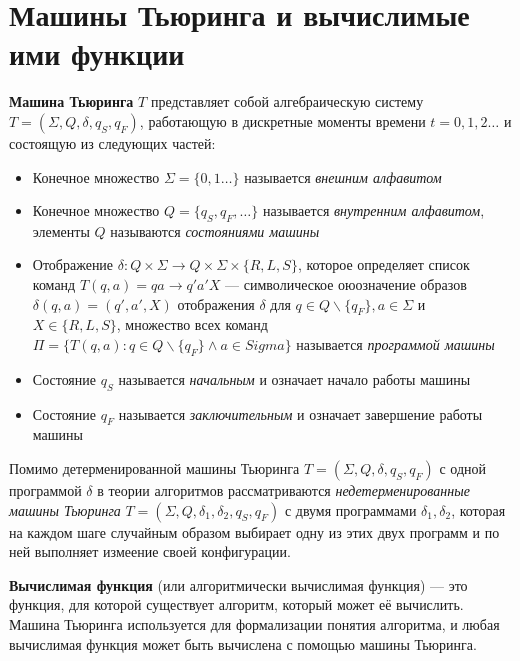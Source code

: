\section{Машины Тьюринга и вычислимые ими функции}
\dftion \textbf{Машина Тьюринга} $T$ представляет собой алгебраическую систему $T = (\Sigma, Q, \delta, q_S, q_F)$, работающую в дискретные моменты времени $t=0,1,2\dots$ и состоящую из следующих частей:

\begin{itemize}
    \item Конечное множество $\Sigma=\{0,1\dots\}$ называется \textit{внешним алфавитом}
    \item Конечное множество $Q = \{q_S, q_F, \dots\}$ называется \textit{внутренним алфавитом}, элементы $Q$ называются \textit{состояниями машины}
    \item Отображение $\delta: Q \times \Sigma \to Q \times \Sigma \times \{R, L, S\}$, которое определяет список команд $T(q, a) = qa \to q'a'X$ --- символическое оюозначение образов $\delta(q, a) = (q', a', X)$ отображения $\delta$ для $q \in Q \backslash \{q_F\}, a \in \Sigma$ и $X \in \{R, L, S\}$, множество всех команд $\Pi = \{T(q, a): q \in Q \backslash \{q_F\} \land a \in Sigma\}$ называется \textit{программой машины}
    \item Состояние $q_S$ называется \textit{начальным} и означает начало работы машины
    \item Состояние $q_F$ называется \textit{заключительным} и означает завершение работы машины
\end{itemize}

Помимо детерменированной машины Тьюринга $T=(\Sigma, Q, \delta, q_S, q_F)$ с одной программой $\delta$ в теории алгоритмов рассматриваются \textit{недетерменированные машины Тьюринга} $T=(\Sigma, Q, \delta_1, \delta_2, q_S, q_F)$ с двумя программами $\delta_1, \delta_2$, которая на каждом шаге случайным образом выбирает одну из этих двух программ и по ней выполняет измеение своей конфигурации.

\dftion \textbf{Вычислимая функция} (или алгоритмически вычислимая функция) — это функция, для которой существует алгоритм, который может её вычислить. Машина Тьюринга используется для формализации понятия алгоритма, и любая вычислимая функция может быть вычислена с помощью машины Тьюринга.